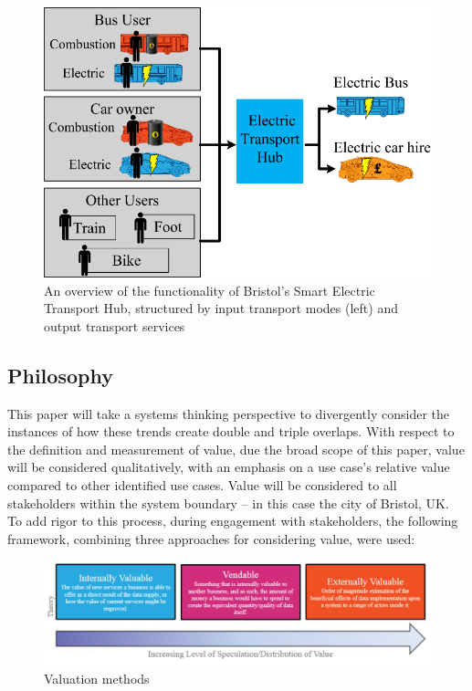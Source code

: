 \documentclass[journal]{IEEEtran}
\begin{document}
\begin{figure}[!htb]
\centering
\includegraphics[width=\columnwidth]{images/bristolhub.png}
\caption{An overview of the functionality of Bristol's Smart Electric
  Transport Hub, structured by input transport modes (left) and output
  transport services}
\label{fig:bristolhub}
\end{figure}

\subsection{Philosophy}

This paper will take a systems thinking perspective to divergently
consider the instances of how these trends create double and triple
overlaps. With respect to the definition and measurement of value, due
the broad scope of this paper, value will be considered qualitatively,
with an emphasis on a use case's relative value compared to other
identified use cases. Value will be considered to all stakeholders
within the system boundary -- in this case the city of Bristol, UK. To
add rigor to this process, during engagement with stakeholders, the
following framework, combining three approaches for considering value,
were used:

\begin{figure}[!h]
\centering
\includegraphics[width=\columnwidth]{images/valuationmethods.png}
\caption{Valuation methods}
\label{fig:valuationmethods}
\end{figure}
\end{document}
